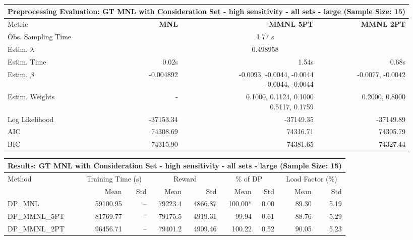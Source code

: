 
\begin{samepage}
\begin{center}
  \small
  \begin{tabular}{l|r|r|r}
    \toprule
    \multicolumn{4}{c}{\textbf{Preprocessing Evaluation: GT MNL with Consideration Set - high sensitivity - all sets - large (Sample Size: 15)}} \\
    \midrule
    Metric & \textbf{MNL} & \textbf{MMNL 5PT} & \textbf{MMNL 2PT} \\
    \midrule
    Obs. Sampling Time & \multicolumn{3}{c}{1.77 s} \\
    Estim. $\lambda$ & \multicolumn{3}{c}{0.498958} \\
    Estim. Time & 0.02s & 1.54s & 0.68s \\
    Estim. $\beta$ & -0.004892 & \makecell[tr]{-0.0093, -0.0044, -0.0044 \\ -0.0044, -0.0044} & -0.0077, -0.0042 \\
    Estim. Weights & - & \makecell[tr]{0.1000, 0.1124, 0.1000 \\ 0.5117, 0.1759} & 0.2000, 0.8000 \\
    Log Likelihood & -37153.34 & -37149.35 & -37149.89 \\
    AIC & 74308.69 & 74316.71 & 74305.79 \\
    BIC & 74315.90 & 74381.65 & 74327.44 \\
    \bottomrule
  \end{tabular}
\end{center}
\begin{center}
  \small
  \begin{tabular}{l|rr|rr|rr|rr}
    \toprule
    \multicolumn{9}{c}{\textbf{Results: GT MNL with Consideration Set - high sensitivity - all sets - large (Sample Size: 15)}} \\
    \midrule
    Method & \multicolumn{2}{c|}{Training Time (s)} & \multicolumn{2}{c|}{Reward} & \multicolumn{2}{c|}{\% of DP} & \multicolumn{2}{c}{Load Factor (\%)} \\
    & Mean & Std & Mean & Std & Mean & Std & Mean & Std \\
    \midrule
    DP\_MNL      & 59100.95 &    -- &    79223.4 &    4866.87 & 100.00* &    0.00 &   89.30 &    5.19 \\
    DP\_MMNL\_5PT & 81769.77 &    -- &    79175.5 &    4919.31 &   99.94 &    0.61 &   88.76 &    5.29 \\
    DP\_MMNL\_2PT & 96456.71 &    -- &    79401.2 &    4909.46 &  100.22 &    0.52 &   90.05 &    5.23 \\

\end{tabular}
\end{center}
\end{samepage}

